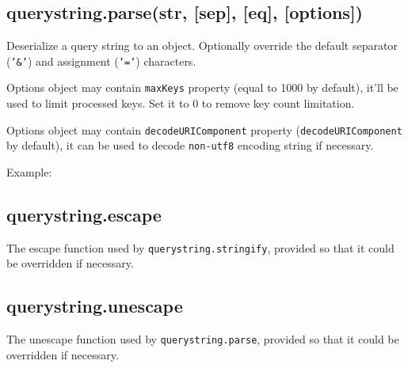 \subsection{querystring.parse(str, {[}sep{]}, {[}eq{]},
{[}options{]})}\label{querystring.parsestr-sep-eq-options}

Deserialize a query string to an object. Optionally override the default
separator (\texttt{'\&'}) and assignment (\texttt{'='}) characters.

Options object may contain \texttt{maxKeys} property (equal to 1000 by
default), it'll be used to limit processed keys. Set it to 0 to remove
key count limitation.

Options object may contain \texttt{decodeURIComponent} property
(\texttt{decodeURIComponent} by default), it can be used to decode
\texttt{non-utf8} encoding string if necessary.

Example:

\begin{Shaded}
\end{Shaded}

\subsection{querystring.escape}\label{querystring.escape}

The escape function used by \texttt{querystring.stringify}, provided so
that it could be overridden if necessary.

\subsection{querystring.unescape}\label{querystring.unescape}

The unescape function used by \texttt{querystring.parse}, provided so
that it could be overridden if necessary.
